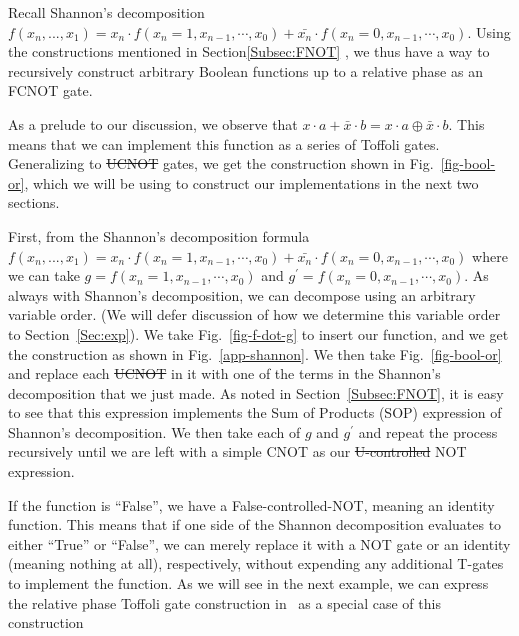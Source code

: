 \documentclass[paper]{ieice}
\providecommand{\DIFadd}[1]{{\protect\color{blue}{#1}}} %
\providecommand{\DIFdel}[1]{{\protect\color{red}\sout{#1}}}                      %
\providecommand{\DIFaddbegin}{} %
\providecommand{\DIFaddend}{} %
\providecommand{\DIFdelbegin}{} %
\providecommand{\DIFdelend}{} %
\newcommand{\DIFscaledelfig}{0.5}
\newlength{\DIFdelgraphicswidth} %
\newlength{\DIFdelgraphicsheight} %
\newcommand{\DIFaddincludegraphics}[2][]{{\color{blue}\fbox{\DIFOincludegraphics[#1]{#2}}}} %
\newcommand{\DIFdelincludegraphics}[2][]{%
\sbox{\DIFdelgraphicsbox}{\DIFOincludegraphics[#1]{#2}}%
\settoboxwidth{\DIFdelgraphicswidth}{\DIFdelgraphicsbox} %
\settoboxtotalheight{\DIFdelgraphicsheight}{\DIFdelgraphicsbox} %
\scalebox{\DIFscaledelfig}{%
\parbox[b]{\DIFdelgraphicswidth}{\usebox{\DIFdelgraphicsbox}\\[-\baselineskip] \rule{\DIFdelgraphicswidth}{0em}}\llap{\resizebox{\DIFdelgraphicswidth}{\DIFdelgraphicsheight}{%
\setlength{\unitlength}{\DIFdelgraphicswidth}%
\begin{picture}(1,1)%
\thicklines\linethickness{2pt} %
{\color[rgb]{1,0,0}\put(0,0){\framebox(1,1){}}}%
{\color[rgb]{1,0,0}\put(0,0){\line( 1,1){1}}}%
{\color[rgb]{1,0,0}\put(0,1){\line(1,-1){1}}}%
\end{picture}%
}\hspace*{3pt}}} %
} %
\DeclareRobustCommand{\DIFaddbegin}{\DIFOaddbegin \let\includegraphics\DIFaddincludegraphics} %
\DeclareRobustCommand{\DIFaddend}{\DIFOaddend \let\includegraphics\DIFOincludegraphics} %
\DeclareRobustCommand{\DIFdelbegin}{\DIFOdelbegin \let\includegraphics\DIFdelincludegraphics} %
\DeclareRobustCommand{\DIFdelend}{\DIFOaddend \let\includegraphics\DIFOincludegraphics} %
\begin{document}
Recall Shannon's decomposition $f(x_n,...,x_1) = x_n \cdot f(x_n=1,x_{n-1},\cdots,x_0) + \bar{x_n} \cdot f(x_n=0,x_{n-1},\cdots,x_0)$.
Using the constructions mentioned in Section\ref{Subsec:FNOT} , we thus have a way to recursively construct
arbitrary Boolean functions up to a relative phase as an FCNOT gate.

As a prelude to our discussion, we observe that $x \cdot a  + \bar{x} \cdot b = x \cdot a \oplus \bar{x} \cdot b$.
This means that we can implement this function as a series of Toffoli gates. Generalizing to \DIFdelbegin \DIFdel{UCNOT }\DIFdelend \DIFaddbegin \DIFadd{FCNOT }\DIFaddend gates, we get
the construction shown in Fig.~\ref{fig-bool-or}, which we will be using to construct our implementations in the
next two sections.


First, from the Shannon's decomposition
formula~$f(x_n,...,x_1) = x_n \cdot f(x_n=1,x_{n-1},\cdots,x_0) + \bar{x_n} \cdot f(x_n=0,x_{n-1},\cdots,x_0)$
where we can take $g=f(x_n=1,x_{n-1},\cdots,x_0)$ and $g^{\prime}=f(x_n=0,x_{n-1},\cdots,x_0)$. As always with
Shannon's decomposition, we can decompose using an arbitrary variable order. (We will defer discussion of how we
determine this variable order to Section~\ref{Sec:exp}). We take Fig.~\ref{fig-f-dot-g} to insert our function, and
we get the construction as shown in Fig.~\ref{app-shannon}. We then take Fig.~\ref{fig-bool-or} and replace each
\DIFdelbegin \DIFdel{UCNOT }\DIFdelend \DIFaddbegin \DIFadd{FCNOT }\DIFaddend in it with one of the terms in the Shannon's decomposition that we just made. As noted in Section~\ref{Subsec:FNOT}, it is easy to see that this expression implements the Sum of Products (SOP) expression
of Shannon's decomposition. We then take each of $g$ and $g^{\prime}$ and repeat the process recursively until we
are left with a simple CNOT as our \DIFdelbegin \DIFdel{U-controlled }\DIFdelend \DIFaddbegin \DIFadd{F-controlled }\DIFaddend NOT expression.

If the function is ``False'', we have a False-controlled-NOT, meaning an identity function. This means that if one side of
the Shannon decomposition evaluates to either ``True'' or ``False'', we can merely replace it with a NOT gate or an
identity (meaning nothing at all), respectively, without expending any additional T-gates to implement the
function. As we will see in the next example, we can express the relative phase Toffoli gate construction
in~\cite{bib-amy-phase-state} as a special case of this construction\DIFaddbegin \DIFadd{.
}\DIFaddend 
\end{document}
